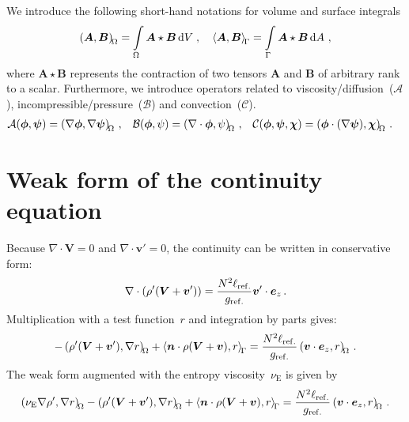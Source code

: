 We introduce the following short-hand notations for volume and surface integrals
\begin{equation*}
	\left(\bm A, \bm B\right)_{\!{\Omega}} = \int\limits_{\Omega} \bm A \star \bm B\, \mathrm{d}V \; , \quad
	\left\langle\bm A, \bm B\right\rangle_{\!{\Gamma}}  = \int\limits_{\Gamma} \bm A \star \bm B\, \mathrm{d}A \ ,
\end{equation*}
where $\bm A \star \bm B$ represents the contraction of two tensors $\bm A$ and $\bm B$ of arbitrary rank to a scalar. Furthermore, we introduce operators related to viscosity/diffusion~($\mathcal{A}$), incompressible/pressure~($\mathcal{B}$) and convection~($\mathcal{C}$).
\begin{align*}
\begin{aligned}
	\mathcal{A}(\bm{\phi}, \bm{\psi})&=\left(\nabla\bm{\phi}, \nabla\bm{\psi}\right)_{\!{\Omega}}\,, &
	\mathcal{B}(\bm{\phi}, \psi)&=\left(\nabla\cdot\bm{\phi}, \psi\right)_{\!{\Omega}}\,, &
	\mathcal{C}(\bm{\phi}, \bm{\psi}, \bm{\chi})&=\left(\bm{\phi} \cdot (\nabla\bm{\psi}), \bm{\chi}\right)_{\!{\Omega}}\,.
\end{aligned}
\end{align*}

\section{Weak form of the continuity equation}
Because $\nabla\cdot\bm{V}=0$ and  $\nabla\cdot\bm{v}'=0$, the continuity can be written in conservative form:
\begin{equation}
	\nabla\cdot(\rho'(\bm{V}+\bm{v}'))=\frac{N^2\ell_{\mathrm{ref.}}}{g_{\mathrm{ref.}}}\bm{v}'\cdot\bm{e}_z\,.
\end{equation}
Multiplication with a test function~$r$ and integration by parts gives:
\begin{equation}
	-\left(\rho'(\bm{V}+\bm{v}'), \nabla r\right)_{\!{\Omega}}+\left\langle\bm{n}\cdot\rho(\bm{V}+\bm{v}), r\right\rangle_{\!{\Gamma}}=\frac{N^2\ell_{\mathrm{ref.}}}{g_{\mathrm{ref.}}}\left(\bm{v}\cdot\bm{e}_z, r\right)_{\!{\Omega}}\,.
\end{equation}
The weak form augmented with the entropy viscosity~$\nu_\mathrm{E}$ is given by
\begin{equation}
	\left(\nu_\mathrm{E}\nabla\rho', \nabla r\right)_{\!{\Omega}}-\left(\rho'(\bm{V}+\bm{v}'), \nabla r\right)_{\!{\Omega}}+\left\langle\bm{n}\cdot\rho(\bm{V}+\bm{v}), r\right\rangle_{\!{\Gamma}}=\frac{N^2\ell_{\mathrm{ref.}}}{g_{\mathrm{ref.}}}\left(\bm{v}\cdot\bm{e}_z, r\right)_{\!{\Omega}}\,.
\end{equation}

